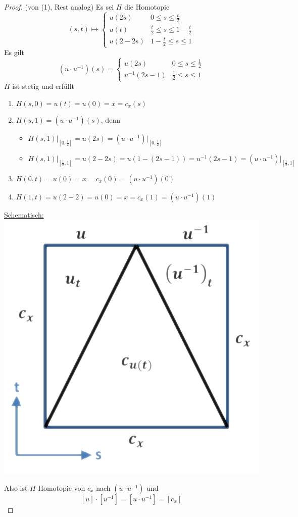 \documentclass[a4paper,11pt,notitlepage]{report}
\theoremstyle{definition}
\begin{document}
\begin{proof} (von (1), Rest analog)
\newline
Es sei $H$ die Homotopie 
$$(s,t) \mapsto \begin{cases} u(2s) & 0 \leq s \leq \frac{t}{2} \\ u(t) & \frac{t}{2} \leq s \leq 1- \frac{t}{2} \\ u(2-2s) & 1-\frac{t}{2} \leq s \leq 1 \end{cases}$$
Es gilt 
$$(u \cdot u^{-1})(s) = \begin{cases} u(2s) & 0 \leq s \leq \frac{1}{2} \\ u^{-1}(2s-1) & \frac{1}{2} \leq s \leq 1 \end{cases}$$
$H$ ist stetig und erfüllt
\begin{enumerate}
	\item $H(s,0) = u(t) = u(0) = x = c_x(s)$
	\item $H(s,1) = (u \cdot u^{-1})(s)$, denn
	\begin{itemize}
		\item $H(s,1) \big |_{[0, \frac{1}{2}]} = u(2s) = (u \cdot u^{-1}) \big |_{[0, \frac{1}{2}]}$
		\item $H(s,1) \big |_{[\frac{1}{2},1]} = u(2-2s) = u(1-(2s-1)) = u^{-1}(2s-1) = (u \cdot u^{-1}) \big |_{[\frac{1}{2},1]}$  
	\end{itemize}
	\item $H(0,t) = u(0) = x = c_x(0) = (u \cdot u^{-1})(0)$
	\item $H(1,t) = u(2-2) = u(0) = x = c_x(1) = (u \cdot u^{-1})(1)$
\end{enumerate}

\underline{Schematisch:} \includegraphics[scale=0.4]{images/Beweis_Produkt_Lemma.png}

Also ist $H$ Homotopie von $c_x$ nach $(u \cdot u^{-1})$ und $$[u] \cdot [u^{-1}] = [u \cdot u^{-1}] = [c_x]$$
\end{proof}
\end{document}
